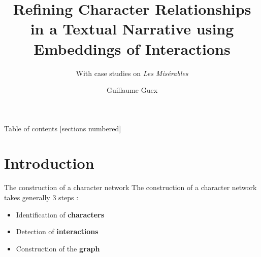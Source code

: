 \documentclass[10pt]{beamer}
\title{Refining Character Relationships in a Textual Narrative using Embeddings of Interactions}
\subtitle{With case studies on \emph{Les Misérables}}
\date{}
\author{Guillaume Guex}
\institute{University of Lausanne}
\newcommand{\imp}[1]{\textbf{\color{cyan}#1}}
\begin{document}
	
	
	\maketitle
	
	
	\begin{frame}{Table of contents}
		[sections numbered]
		\tableofcontents%
	\end{frame}

	
	\section[Introduction]{Introduction}
	
	
	\begin{frame}{The construction of a character network}
		The construction of a character network takes generally 3 steps \cite{labatut_extraction_2019}:
		\begin{itemize}
			\item Identification of \imp{characters} 
			\item Detection of \imp{interactions}
			\item Construction of the \imp{graph}
		\end{itemize}
	\end{frame}

	
\end{document}
